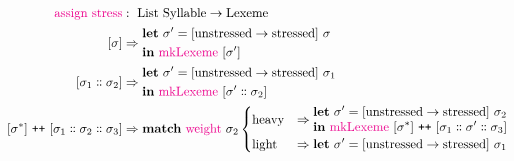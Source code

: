 \documentclass{report}[12pt]
\begin{document}
\begin{align*}
  \text{\textcolor{magenta}{assign stress}} & :\ \text{List Syllable} \rightarrow \text{Lexeme} \\
  [\sigma] & \Rightarrow \begin{aligned}
                                                            & \textbf{let}\ \sigma' = [\text{unstressed} \rightarrow \text{stressed}] \ \sigma \\
                                                            & \textbf{in}\ \text{\textcolor{magenta}{mkLexeme}}\ [\sigma'] \\
                                                          \end{aligned} \\
  [\sigma_1 \dblcolon \sigma_2] & \Rightarrow \begin{aligned}
                                                            & \textbf{let}\ \sigma' = [\text{unstressed} \rightarrow \text{stressed}] \ \sigma_1 \\
                                                            & \textbf{in}\ \text{\textcolor{magenta}{mkLexeme}}\ [\sigma' \dblcolon \sigma_2] \\
                                                          \end{aligned} \\
  [\sigma^{*}]\ \texttt{++}\ [\sigma_1 \dblcolon \sigma_2 \dblcolon \sigma_3] & \Rightarrow \textbf{match}\ \text{\textcolor{magenta}{weight}}\ \sigma_2
                                                      \begin{cases}
                                                        \text{heavy} & \Rightarrow \begin{aligned}
                                                                                     & \textbf{let}\ \sigma' = [\text{unstressed} \rightarrow \text{stressed}]\ \sigma_2 \\
                                                                                     & \textbf{in}\ \text{\textcolor{magenta}{mkLexeme}}\ [\sigma^{*}]\ \texttt{++}\ [\sigma_1 \dblcolon \sigma' \dblcolon \sigma_3] \\
                                                                                   \end{aligned} \\
                                                        \text{light} & \Rightarrow \begin{aligned}
                                                                                     & \textbf{let}\ \sigma' = [\text{unstressed} \rightarrow \text{stressed}]\ \sigma_1 \\

\end{aligned}
\end{cases}
\end{align*}
\end{document}
